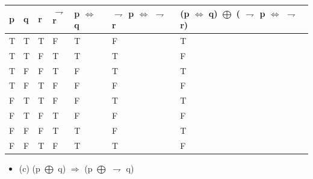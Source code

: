 \documentclass{article}
\begin{document}
\begin{itemize}

\begin{table2}[]
\begin{tabular}{|l|l|l|l|l|l|l|}
\hline
p & q & r & $$\rightharpoondown$$ r & p $\Leftrightarrow$ q & $\rightharpoondown$ p $\Leftrightarrow$ $\rightharpoondown$ r & (p $\Leftrightarrow$ q) $\bigoplus$ ( $\rightharpoondown$ p $\Leftrightarrow$ $\rightharpoondown$ r) \\ \hline
T & T & T & F  & T                   & F                           & T                                                             \\ \hline
T & T & F & T  & T                   & T                           & F                                                             \\ \hline
T & F & F & T  & F                   & T                           & T                                                             \\ \hline
T & F & T & F  & F                   & F                           & F                                                             \\ \hline
F & T & T & F  & F                   & T                           & T                                                             \\ \hline
F & T & F & T  & F                   & F                           & F                                                             \\ \hline
F & F & F & T  & T                   & F                           & T                                                             \\ \hline
F & F & T & F  & T                   & T                           & F                                                             \\ \hline
\end{tabular}
\end{table2}
\end{itemize}

\begin{itemize}
 \item (c) (p  $\bigoplus$ q) $\Rightarrow$ (p $\bigoplus$ $\rightharpoondown$ q)  
\end{itemize}
\end{document}
